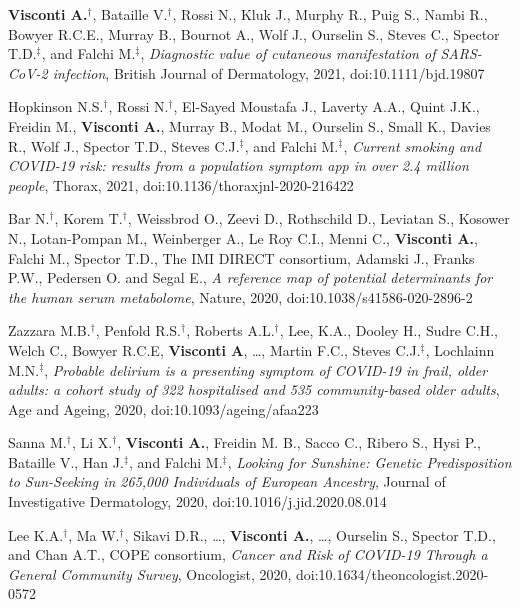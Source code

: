 \documentclass[a4paper,10pt]{article}
\begin{document}
{\begin{itemize}
	     \textbf{Visconti A.}$^{\textbf{$\dag $}}$, Bataille V.$^{\textbf{$\dag $}}$, Rossi N., Kluk J., Murphy R., Puig S., Nambi R., Bowyer R.C.E., Murray B., Bournot A., Wolf J., Ourselin S., Steves C., Spector T.D.$^{\textbf{$\ddag $}}$, and Falchi M.$^{\textbf{$\ddag $}}$, \emph{Diagnostic value of cutaneous manifestation of SARS-CoV-2 infection}, British Journal of Dermatology, 2021, doi:10.1111/bjd.19807
								
		 Hopkinson N.S.$^{\textbf{$\dag $}}$, Rossi N.$^{\textbf{$\dag $}}$, El-Sayed Moustafa J., Laverty A.A., Quint J.K., Freidin M., \textbf{Visconti A.}, Murray B., Modat M., Ourselin S., Small K., Davies R., Wolf J., Spector T.D., Steves C.J.$^{\textbf{$\ddag $}}$, and Falchi M.$^{\textbf{$\ddag $}}$, \emph{Current smoking and COVID-19 risk: results from a population symptom app in over 2.4 million people}, Thorax, 2021, doi:10.1136/thoraxjnl-2020-216422
			
		 Bar N.$^{\textbf{$\dag $}}$, Korem T.$^{\textbf{$\dag $}}$, Weissbrod O., Zeevi D., Rothschild D., Leviatan S., Kosower N., Lotan-Pompan M., Weinberger A., Le Roy C.I., Menni C., \textbf{Visconti A.}, Falchi M., Spector T.D., The IMI DIRECT consortium, Adamski J., Franks P.W., Pedersen O. and Segal E., \emph{A reference map of potential determinants for the human serum metabolome}, Nature, 2020, doi:10.1038/s41586-020-2896-2
		
		 Zazzara M.B.$^{\textbf{$\dag $}}$, Penfold R.S.$^{\textbf{$\dag $}}$, Roberts A.L.$^{\textbf{$\dag $}}$, Lee, K.A., Dooley H., Sudre C.H., Welch C., Bowyer R.C.E, \textbf{Visconti A}, \dots, Martin F.C., Steves C.J.$^{\textbf{$\ddag $}}$, Lochlainn M.N.$^{\textbf{$\ddag $}}$, \emph{Probable delirium is a presenting symptom of COVID-19 in frail, older adults: a cohort study of 322 hospitalised and 535 community-based older adults}, Age and Ageing, 2020, doi:10.1093/ageing/afaa223
		
		 Sanna M.$^{\textbf{$\dag $}}$, Li X.$^{\textbf{$\dag $}}$, \textbf{Visconti A.}, Freidin M. B., Sacco C., Ribero S., Hysi P., Bataille V., Han J.$^{\textbf{$\ddag $}}$, and Falchi M.$^{\textbf{$\ddag $}}$, \emph{Looking for Sunshine: Genetic Predisposition to Sun-Seeking in 265,000 Individuals of European Ancestry}, Journal of Investigative Dermatology, 2020, doi:10.1016/j.jid.2020.08.014
		
		 Lee K.A.$^{\textbf{$\dag $}}$, Ma W.$^{\textbf{$\dag $}}$, Sikavi D.R., \dots, \textbf{Visconti A.}, \dots, Ourselin S., Spector T.D., and Chan A.T., COPE consortium, \emph{Cancer and Risk of COVID-19 Through a General Community Survey}, Oncologist, 2020, doi:10.1634/theoncologist.2020-0572		


\end{itemize}}
\end{document}
